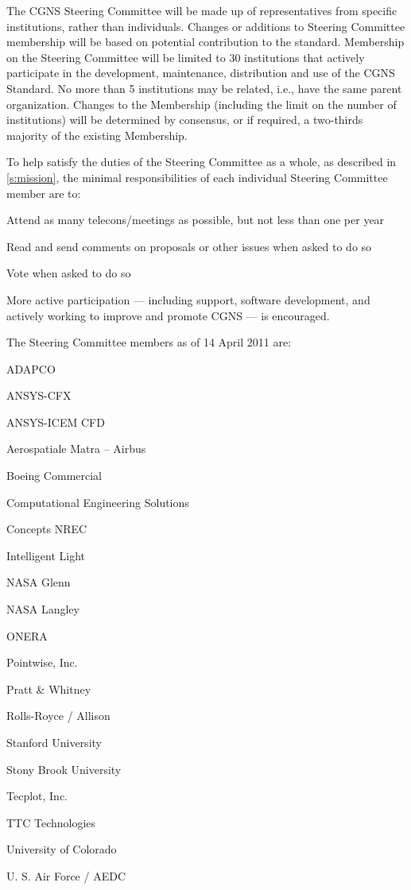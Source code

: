 The CGNS Steering Committee will be made up of representatives from
specific institutions, rather than individuals.
Changes or additions to Steering Committee membership will be based on
potential contribution to the standard.
Membership on the Steering Committee will be limited to 30 institutions
that actively participate in the development, maintenance, distribution
and use of the CGNS Standard.
No more than 5 institutions may be related, i.e., have the same parent
organization.
Changes to the Membership (including the limit on the number of
institutions) will be determined by consensus, or if required, a
two-thirds majority of the existing Membership.

To help satisfy the duties of the Steering Committee as a whole, as
described in \autoref{s:mission}, the minimal responsibilities of each
individual Steering Committee member are to:
\begin{itemize*}
\item Attend as many telecons/meetings as possible, but not less than
      one per year
\item Read and send comments on proposals or other issues when asked to
      do so
\item Vote when asked to do so
\end{itemize*}
More active participation --- including support, software development,
and actively working to improve and promote CGNS --- is encouraged.

\newpage
The Steering Committee members as of 14 April 2011 are:

\begin{itemize*}
\item ADAPCO
\item ANSYS-CFX
\item ANSYS-ICEM CFD
\item Aerospatiale Matra -- Airbus
\item Boeing Commercial
\item Computational Engineering Solutions
\item Concepts NREC
\item Intelligent Light
\item NASA Glenn
\item NASA Langley
\item ONERA
\item Pointwise, Inc.
\item Pratt \& Whitney
\item Rolls-Royce / Allison
\item Stanford University
\item Stony Brook University
\item Tecplot, Inc.
\item TTC Technologies
\item University of Colorado
\item U. S. Air Force / AEDC
\end{itemize*}


